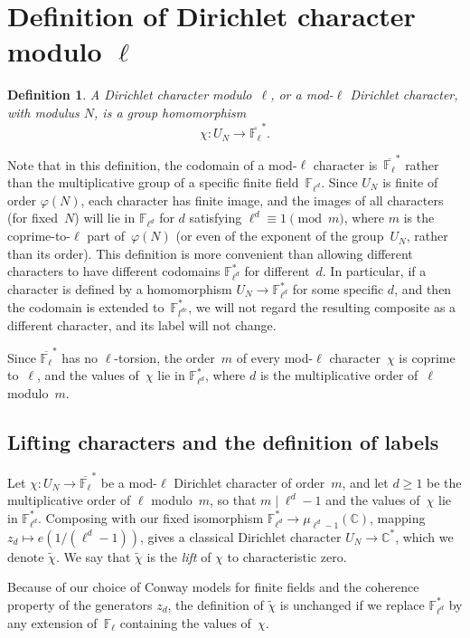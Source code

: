 \documentclass[a4paper, 10pt]{amsart}
\newtheorem{defn}{Definition}%
\def\C{{\mathbb C}}
\def\F{{\mathbb F}}
\def\Fl{{\mathbb F}_{\ell}}
\def\Fld{{\mathbb F}_{\ell^d}}
\def\Flbar{\overline{{\mathbb F}_{\ell}}}
\begin{document}
\section{Definition of Dirichlet character modulo \texorpdfstring{$\ell$}{ell}}

\begin{defn} A \emph{Dirichlet character modulo~$\ell$}, or a
  \emph{mod-$\ell$ Dirichlet character}, with modulus $N$, is a group
  homomorphism
  \[
  \chi:   U_N \to \Flbar^*.
  \]
\end{defn}
Note that in this definition, the codomain of a mod-$\ell$ character
is~$\Flbar^*$ rather than the multiplicative group of a specific
finite field~$\Fld$.  Since $ U_N$ is finite of order $\varphi(N)$,
each character has finite image, and the images of all characters (for
fixed~$N$) will lie in $\Fld$ for $d$ satisfying
$\ell^d\equiv1\pmod{m}$, where $m$ is the coprime-to-$\ell$ part
of~$\varphi(N)$ (or even of the exponent of the group~$ U_N$, rather
than its order).  This definition is more convenient than allowing
different characters to have different codomains $\Fld^*$ for
different~$d$.  In particular, if a character is defined by a
homomorphism $ U_N\to\Fld^*$ for some specific $d$, and then the
codomain is extended to~$\F_{l^{de}}^*$, we will not regard the
resulting composite as a different character, and its label will not
change.

Since $\Flbar^*$ has no $\ell$-torsion, the order~$m$ of every
mod-$\ell$ character~$\chi$ is coprime to~$\ell$, and the values
of~$\chi$ lie in $\Fld^*$, where $d$ is the multiplicative order
of~$\ell$ modulo~$m$.

\subsection{Lifting characters and the definition of labels}

Let $\chi:  U_N \to \Flbar^*$ be a mod-$\ell$ Dirichlet character
of order~$m$, and let $d\ge1$ be the multiplicative order of $\ell$
modulo~$m$, so that $m\mid\ell^d-1$ and the values of~$\chi$ lie in
$\Fld^*$.  Composing with our fixed isomorphism $\Fld^* \to
\mu_{\ell^d-1}(\C)$, mapping $z_d\mapsto e(1/(\ell^d-1))$, gives a
classical Dirichlet character $ U_N\to\C^*$, which we denote
$\tilde{\chi}$.  We say that $\tilde{\chi}$ is the \emph{lift} of
$\chi$ to characteristic zero.

Because of our choice of Conway models for finite fields and the
coherence property of the generators $z_d$, the definition of
$\tilde{\chi}$ is unchanged if we replace $\Fld^*$ by any extension
of~$\Fl$ containing the values of~$\chi$.
\end{document}
